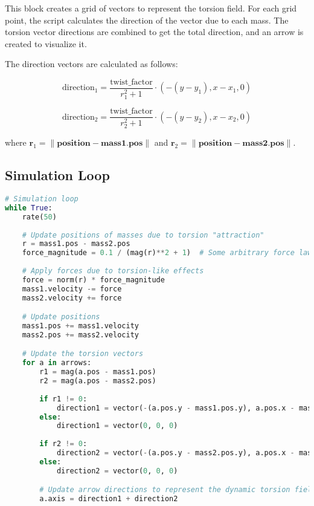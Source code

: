 \documentclass{article}
\begin{document}
This block creates a grid of vectors to represent the torsion field. For each grid point, the script calculates the direction of the vector due to each mass. The torsion vector directions are combined to get the total direction, and an arrow is created to visualize it.

The direction vectors are calculated as follows:

\[
\text{direction}_1 = \frac{\text{twist\_factor}}{r_1^2 + 1} \cdot \left( -(y - y_1), x - x_1, 0 \right)
\]

\[
\text{direction}_2 = \frac{\text{twist\_factor}}{r_2^2 + 1} \cdot \left( -(y - y_2), x - x_2, 0 \right)
\]

where \( \mathbf{r}_1 = \|\mathbf{position} - \mathbf{mass1.pos}\| \) and \( \mathbf{r}_2 = \|\mathbf{position} - \mathbf{mass2.pos}\| \).

\subsection{Simulation Loop}
\begin{lstlisting}[language=Python, breaklines=true]
# Simulation loop
while True:
    rate(50)
    
    # Update positions of masses due to torsion "attraction"
    r = mass1.pos - mass2.pos
    force_magnitude = 0.1 / (mag(r)**2 + 1)  # Some arbitrary force law
    
    # Apply forces due to torsion-like effects
    force = norm(r) * force_magnitude
    mass1.velocity -= force
    mass2.velocity += force

    # Update positions
    mass1.pos += mass1.velocity
    mass2.pos += mass2.velocity

    # Update the torsion vectors
    for a in arrows:
        r1 = mag(a.pos - mass1.pos)
        r2 = mag(a.pos - mass2.pos)
        
        if r1 != 0:
            direction1 = vector(-(a.pos.y - mass1.pos.y), a.pos.x - mass1.pos.x, 0) * (twist_factor / (r1 ** 2 + 1))
        else:
            direction1 = vector(0, 0, 0)
        
        if r2 != 0:
            direction2 = vector(-(a.pos.y - mass2.pos.y), a.pos.x - mass2.pos.x, 0) * (twist_factor / (r2 ** 2 + 1))
        else:
            direction2 = vector(0, 0, 0)

        # Update arrow directions to represent the dynamic torsion field
        a.axis = direction1 + direction2
\end{lstlisting}
\end{document}
